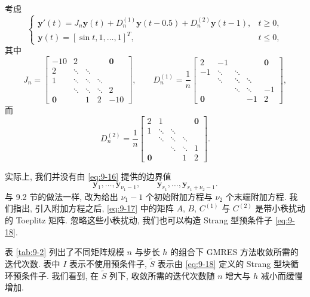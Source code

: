 \begin{example}
\label{ex:9-2}
考虑
\[
  \left\{
  \begin{array}{ll}
    \mathbf{y}'(t)=J_n\mathbf{y}(t)+D_n^{(1)}\mathbf{y}(t-0.5)
      +D_n^{(2)}\mathbf{y}(t-1), & t\geqslant0,\\
    \mathbf{y}(t)=[\sin t,1,\ldots,1]^T, & t\leqslant0,
  \end{array}
  \right.
\]
其中
\[
  J_n=\begin{bmatrix}
    -10 & 2 & & & \mathbf{0}\\
    2 & \ddots & \ddots & & \\
    1 & \ddots & \ddots & \ddots & \\
    & \ddots & \ddots & \ddots & 2\\
    \mathbf{0} & & 1 & 2 & -10
  \end{bmatrix},\qquad
  D_n^{(1)}=\frac{1}{n}\begin{bmatrix}
    2 & -1 & & & \mathbf{0}\\
    -1 & \ddots & \ddots & & \\
    & \ddots & \ddots & \ddots & \\
    & & \ddots & \ddots & -1\\
    \mathbf{0} & & & -1 & 2
  \end{bmatrix},
\]
而
\[
  D_n^{(2)}=\frac{1}{n}\begin{bmatrix}
    2 & 1 & & & \mathbf{0}\\
    1 & \ddots & \ddots & & \\
    & \ddots & \ddots & \ddots & \\
    & & \ddots & \ddots & 1\\
    \mathbf{0} & & & 1 & 2
  \end{bmatrix}.
\]
\end{example}

实际上, 我们并没有由 \eqref{eq:9-16} 提供的边界值
\[
  \mathbf{y}_1,\ldots,\mathbf{y}_{\nu_1-1},\qquad
  \mathbf{y}_{r_1},\ldots,\mathbf{y}_{r_1+\nu_2-1}.
\]
与 9.2 节的做法一样, 改为给出 $\nu_1-1$ 个初始附加方程与 $\nu_2$ 个末端附加方程. 我们指出, 引入附加方程之后, \eqref{eq:9-17} 中的矩阵 $A$, $B$, $C^{(1)}$ 与 $C^{(2)}$ 是带小秩扰动的 Toeplitz 矩阵. 忽略这些小秩扰动, 我们也可以构造 Strang 型预条件子 \eqref{eq:9-18}.

表 \ref{tab:9-2} 列出了不同矩阵规模 $n$ 与步长 $h$ 的组合下 GMRES 方法收敛所需的迭代次数. 表中 $I$ 表示不使用预条件子, $\widetilde{S}$ 表示由 \eqref{eq:9-18} 定义的 Strang 型块循环预条件子. 我们看到, 在 $\widetilde{S}$ 列下, 收敛所需的迭代次数随 $n$ 增大与 $h$ 减小而缓慢增加.

